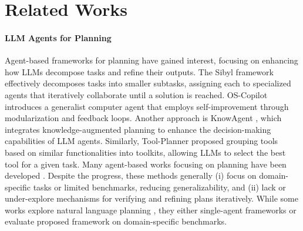\section{Related Works}
\label{sec:related_works}

\paragraph{LLM Agents for Planning}

Agent-based frameworks for planning have gained interest, focusing on enhancing how LLMs decompose tasks and refine their outputs. The Sibyl framework \citep{wang2024sibyl} effectively decomposes tasks into smaller subtasks, assigning each to specialized agents that iteratively collaborate until a solution is reached. OS-Copilot \citep{wu2024copilot} introduces a generalist computer agent that employs self-improvement through modularization and feedback loops. Another approach is KnowAgent \citep{zhu2024knowagent}, which integrates knowledge-augmented planning to enhance the decision-making capabilities of LLM agents. Similarly, Tool-Planner \citep{liu2024tool} proposed grouping tools based on similar functionalities into toolkits, allowing LLMs to select the best tool for a given task. Many agent-based works focusing on planning have been developed \citep{chen2024reprompt, xie2024human, wang2024promptagent}. Despite the progress, these methods generally (i) focus on domain-specific tasks or limited benchmarks, reducing generalizability, and (ii) lack or under-explore mechanisms for verifying and refining plans iteratively. While some works explore natural language planning \citep{bohnet2024exploring, lee2025evolving}, they either single-agent frameworks or evaluate proposed framework on domain-specific benchmarks.  

